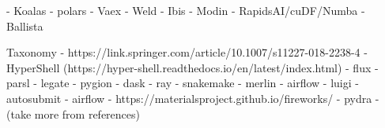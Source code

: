 
- Koalas
- polars
- Vaex
- Weld
- Ibis
- Modin
- RapidsAI/cuDF/Numba
- Ballista

\cite{task_based_taxonomy}

Taxonomy - https://link.springer.com/article/10.1007/s11227-018-2238-4 - HyperShell
(https://hyper-shell.readthedocs.io/en/latest/index.html) - flux - parsl - legate - pygion - dask -
ray - snakemake - merlin - airflow - luigi - autosubmit - airflow -
https://materialsproject.github.io/fireworks/ - pydra - (take more from references)
